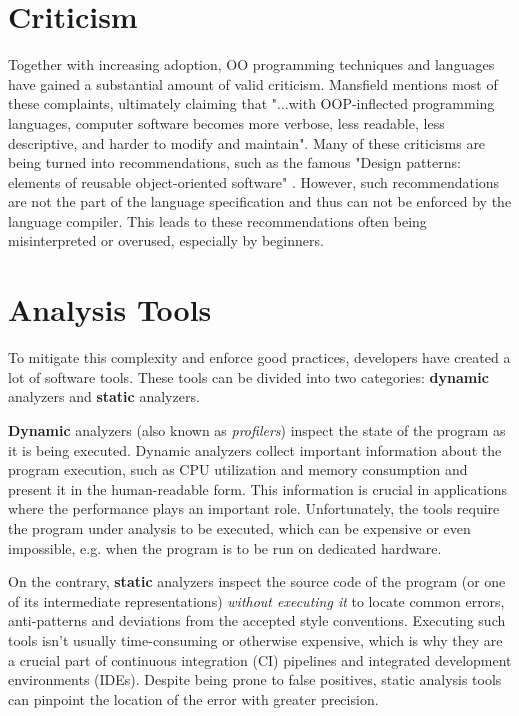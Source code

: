 \section{Criticism}

Together with increasing adoption, OO programming techniques and languages have gained a substantial amount of valid criticism. Mansfield \cite{oopfailed} mentions most of these complaints, ultimately claiming that "...with OOP-inflected programming languages, computer software becomes more
verbose, less readable, less descriptive, and harder to modify and maintain". Many of these criticisms are being turned into recommendations, such as the famous "Design patterns: elements of reusable object-oriented software" \cite{GOFPatterns}. However, such recommendations are not the part of the language specification and thus can not be enforced by the language compiler. This leads to these recommendations often being misinterpreted or overused, especially by beginners.

\section{Analysis Tools}
To mitigate this complexity and enforce good practices, developers have created a lot of software tools. These tools can be divided into two categories: \textbf{dynamic} analyzers and \textbf{static} analyzers.

\textbf{Dynamic} analyzers (also known as \textit{profilers}) inspect the state of the program as it is being executed. Dynamic analyzers collect important information about the program execution, such as CPU utilization and memory consumption and present it in the human-readable form. This information is crucial in applications where the performance plays an important role. Unfortunately, the tools require the program under analysis to be executed, which can be expensive or even impossible, e.g. when the program is to be run on dedicated hardware.

On the contrary, \textbf{static} analyzers inspect the source code of the program (or one of its intermediate representations) \textit{without executing it} to locate common errors, anti-patterns and deviations from the accepted style conventions. Executing such tools isn't usually time-consuming or otherwise expensive, which is why they are a crucial part of continuous integration (CI) pipelines and integrated development environments (IDEs).
Despite being prone to false positives, static analysis tools can pinpoint the location of the error with greater precision.

